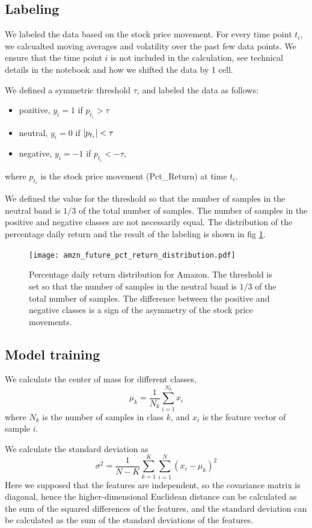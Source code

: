 \documentclass{article}
\begin{document}
\subsection{Labeling}
We labeled the data based on the stock price movement.
For every time point $t_i$,
we calcualted moving averages and volatility over the past few data points.
We ensure that the time point $i$ is not included in the calculation,
see technical details in the notebook and how we shifted the data by 1 cell.

We defined a symmetric threshold $\tau$, and labeled the data as follows:
\begin{itemize}
    \item pozitive, $y_i = 1$ if $p_{t_i} > \tau$
    \item neutral, $y_i = 0$ if $\abs{p_{t_i}} < \tau$
    \item negative, $y_i = -1$ if $p_{t_i} < - \tau$,
\end{itemize}

where $p_{t_i}$ is the stock price movement (Pct\_Return) at time $t_i$.

We defined the value for the threshold so that
the number of samples in the neutral band is $1/3$ of the total number of samples.
The number of samples in the positive and negative classes are not necessarily equal.
The distribution of the percentage daily return and the result of the labeling
is shown in fig \ref{fig:amazon_labelled_pct_return}.

\begin{figure}[ht]
    \centering
    \texttt{[image: amzn\_future\_pct\_return\_distribution.pdf]}
    \caption{Percentage daily return distribution for Amazon.
        The threshold is set so that the number of samples in the neutral band
        is $1/3$ of the total number of samples. The difference between the
        positive and negative classes is a sign of the asymmetry of the
        stock price movements.}
    \label{fig:amazon_labelled_pct_return}
\end{figure}

\subsection{Model training}
We calculate the center of mass for different classes,
\[{\mu _k} = \frac{1}{{{N_k}}}\sum\limits_{i = 1}^{{N_k}} {{x_i}} \]
where $N_k$ is the number of samples in class $k$,
and $x_i$ is the feature vector of sample $i$.

We calculate the standard deviation as
\[{\sigma ^2} = \frac{1}{{N - K}}\sum\limits_{k = 1}^K {\sum\limits_{i = 1}^N {{{\left( {{x_i} - {\mu _k}} \right)}^2}} } \]
Here we supposed that the features are independent, so the covariance matrix is diagonal,
hence the higher-dimensional Euclidean distance can be calculated as the sum of the
squared differences of the features,
and the standard deviation can be calculated
as the sum of the standard deviations of the features.
\end{document}
